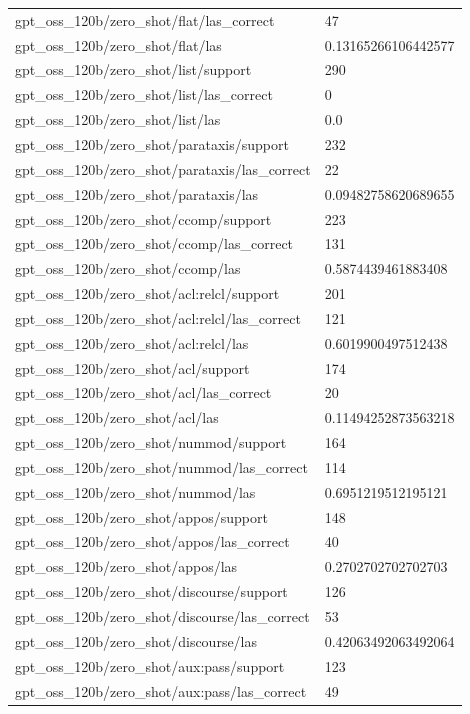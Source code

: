 \begin{tabular}{ll}
gpt\_oss\_120b/zero\_shot/flat/las\_correct & 47 \\
gpt\_oss\_120b/zero\_shot/flat/las & 0.13165266106442577 \\
gpt\_oss\_120b/zero\_shot/list/support & 290 \\
gpt\_oss\_120b/zero\_shot/list/las\_correct & 0 \\
gpt\_oss\_120b/zero\_shot/list/las & 0.0 \\
gpt\_oss\_120b/zero\_shot/parataxis/support & 232 \\
gpt\_oss\_120b/zero\_shot/parataxis/las\_correct & 22 \\
gpt\_oss\_120b/zero\_shot/parataxis/las & 0.09482758620689655 \\
gpt\_oss\_120b/zero\_shot/ccomp/support & 223 \\
gpt\_oss\_120b/zero\_shot/ccomp/las\_correct & 131 \\
gpt\_oss\_120b/zero\_shot/ccomp/las & 0.5874439461883408 \\
gpt\_oss\_120b/zero\_shot/acl:relcl/support & 201 \\
gpt\_oss\_120b/zero\_shot/acl:relcl/las\_correct & 121 \\
gpt\_oss\_120b/zero\_shot/acl:relcl/las & 0.6019900497512438 \\
gpt\_oss\_120b/zero\_shot/acl/support & 174 \\
gpt\_oss\_120b/zero\_shot/acl/las\_correct & 20 \\
gpt\_oss\_120b/zero\_shot/acl/las & 0.11494252873563218 \\
gpt\_oss\_120b/zero\_shot/nummod/support & 164 \\
gpt\_oss\_120b/zero\_shot/nummod/las\_correct & 114 \\
gpt\_oss\_120b/zero\_shot/nummod/las & 0.6951219512195121 \\
gpt\_oss\_120b/zero\_shot/appos/support & 148 \\
gpt\_oss\_120b/zero\_shot/appos/las\_correct & 40 \\
gpt\_oss\_120b/zero\_shot/appos/las & 0.2702702702702703 \\
gpt\_oss\_120b/zero\_shot/discourse/support & 126 \\
gpt\_oss\_120b/zero\_shot/discourse/las\_correct & 53 \\
gpt\_oss\_120b/zero\_shot/discourse/las & 0.42063492063492064 \\
gpt\_oss\_120b/zero\_shot/aux:pass/support & 123 \\
gpt\_oss\_120b/zero\_shot/aux:pass/las\_correct & 49 \\

\end{tabular}
